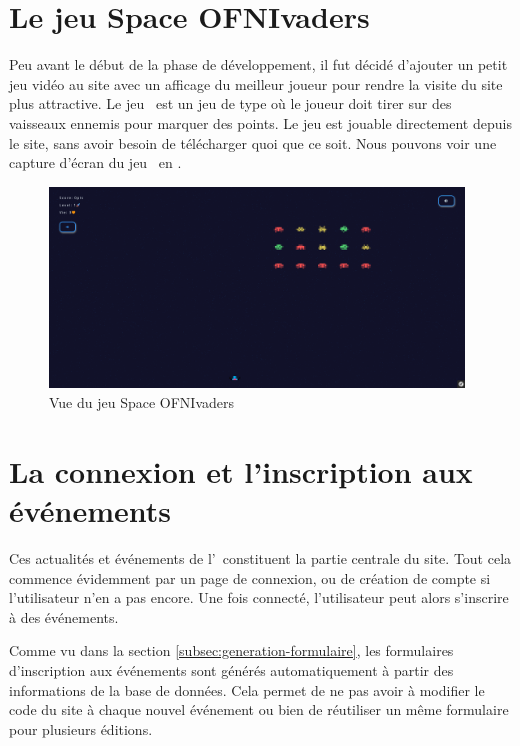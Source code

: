 \section{Le jeu Space OFNIvaders}
\label{sec:jeu}

Peu avant le début de la phase de développement, il fut décidé d'ajouter un petit jeu vidéo au site avec un afficage du meilleur joueur pour rendre la visite du site plus attractive. Le jeu \game\ est un jeu de type  où le joueur doit tirer sur des vaisseaux ennemis pour marquer des points. Le jeu est jouable directement depuis le site, sans avoir besoin de télécharger quoi que ce soit. Nous pouvons voir une capture d'écran du jeu \game\ en .
\bigskip


\begin{figure}[h]
    \centering
    \includegraphics[width=11cm]{assets/pictures/game.png}
    \caption{Vue du jeu Space OFNIvaders}
    \label{fig:game}
\end{figure}
\bigskip


\section{La connexion et l'inscription aux événements}
\label{sec:connexion-inscription}

Ces actualités et événements de l'\ofni\ constituent la partie centrale du site. Tout cela commence évidemment par un page de connexion, ou de création de compte si l'utilisateur n'en a pas encore. Une fois connecté, l'utilisateur peut alors s'inscrire à des événements.

Comme vu dans la section \ref{subsec:generation-formulaire}, les formulaires d'inscription aux événements sont générés automatiquement à partir des informations de la base de données. Cela permet de ne pas avoir à modifier le code du site à chaque nouvel événement ou bien de réutiliser un même formulaire pour plusieurs éditions.
\bigskip

